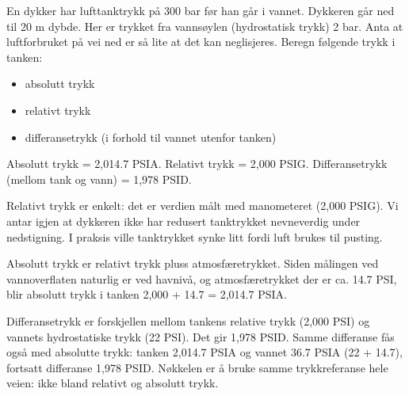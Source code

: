 
En dykker har lufttanktrykk på 300 bar før han går i vannet. Dykkeren går ned til 20 m dybde. Her er trykket fra vannsøylen (hydrostatisk trykk) 2 bar. Anta at luftforbruket på vei ned er så lite at det kan neglisjeres. Beregn følgende trykk i tanken:
\begin{itemize}
\item{} absolutt trykk
\item{} relativt trykk
\item{} differansetrykk (i forhold til vannet utenfor tanken)
\end{itemize}







Absolutt trykk = 2,014.7 PSIA. Relativt trykk = 2,000 PSIG. Differansetrykk (mellom tank og vann) = 1,978 PSID.

\vskip 10pt

Relativt trykk er enkelt: det er verdien målt med manometeret (2,000 PSIG). Vi antar igjen at dykkeren ikke har redusert tanktrykket nevneverdig under nedstigning. I praksis ville tanktrykket synke litt fordi luft brukes til pusting.

Absolutt trykk er relativt trykk pluss atmosfæretrykket. Siden målingen ved vannoverflaten naturlig er ved havnivå, og atmosfæretrykket der er ca. 14.7 PSI, blir absolutt trykk i tanken 2,000 + 14.7 = 2,014.7 PSIA.

Differansetrykk er forskjellen mellom tankens relative trykk (2,000 PSI) og vannets hydrostatiske trykk (22 PSI). Det gir 1,978 PSID. Samme differanse fås også med absolutte trykk: tanken 2,014.7 PSIA og vannet 36.7 PSIA (22 + 14.7), fortsatt differanse 1,978 PSID. Nøkkelen er å bruke samme trykkreferanse hele veien: ikke bland relativt og absolutt trykk.








